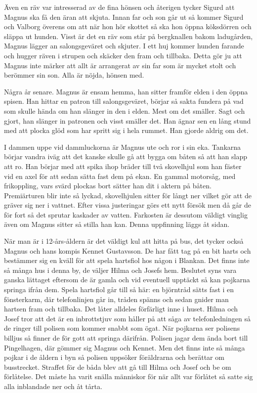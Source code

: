 Även en räv var intresserad av de fina hönsen och återigen tycker Sigurd att Magnus ska få den äran att skjuta. Innan far och son går ut så kommer Sigurd och Valborg överens om att när hon hör skottet så ska hon öppna köksdörren och släppa ut hunden. Visst är det en räv som står på bergknallen bakom ladugården, Magnus lägger an salongsgeväret och skjuter. I ett huj kommer hunden farande och hugger räven i strupen och skäcker den fram och tillbaka. Detta gör ju att Magnus inte märker att allt är arrangerat av sin far som är mycket stolt och berömmer sin son. Alla är nöjda, hönsen med.

Några år senare. Magnus är ensam hemma, han sitter framför elden i den öppna spisen. Han hittar en patron till salongsgeväret, börjar så sakta fundera på vad som skulle hända om han slänger in den i elden. Mest om det smäller. Sagt och gjort, han slänger in patronen och visst smäller det. Han ägnar sen en lång stund med att plocka glöd som har spritt sig i hela rummet. Han gjorde aldrig om det.

I dammen uppe vid dammluckorna är Magnus ute och ror i sin eka. Tankarna börjar vandra iväg att det kanske skulle gå att bygga om båten så att han slapp att ro. Han börjar med att spika ihop bräder till två skovelhjul som han fäster vid en axel för att sedan sätta fast dem på ekan. En gammal motorsåg, med frikoppling, vars svärd plockas bort sätter han dit i aktern på båten. Premiärturen blir inte så lyckad, skovelhjulen sitter för långt ner vilket gör att de gräver sig ner i vattnet. Efter vissa justeringar görs ett nytt försök men då går de för fort så det sprutar kaskader av vatten. Farkosten är dessutom väldigt vinglig även om Magnus sitter så stilla han kan. Denna uppfinning läggs åt sidan.

När man är i 12-års-åldern är det väldigt kul att hitta på bus, det tycker också Magnus och hans kompis Kennet Gustavsson. De har fått tag på en bit harts och bestämmer sig en kväll för att spela hartsfiol hos någon i Blankan. Det finns inte så många hus i denna by, de väljer Hilma och Josefs hem. Beslutet syns vara ganska lättaget eftersom de är gamla och vid eventuell upptäckt så kan pojkarna springa ifrån dem. Spela hartsfiol går till så här: en björntråd sätts fast i en fönsterkarm, där telefonlinjen går in, tråden spänns och sedan gnider man hartsen fram och tillbaka. Det låter alldeles förfärligt inne i huset. Hilma och Josef tror att det är en inbrottstjuv som håller på att såga av telefonledningen så de ringer till polisen som kommer snabbt som ögat. När pojkarna ser polisens billjus så finner de för gott att springa därifrån. Polisen jagar dem ända bort till Pingelhagen, där gömmer sig Magnus och Kennet. Men det finns inte så många pojkar i de åldern i byn så polisen uppsöker föräldrarna och berättar om busstrecket. Straffet för de båda blev att gå till Hilma och Josef och be om förlåtelse. Det måste ha varit snälla människor för när allt var förlåtet så satte sig alla inblandade ner och åt tårta.

